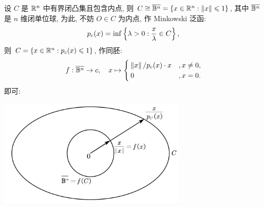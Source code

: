     \begin{Example}
        设 $ C $ 是 $ \mathbb{R}^{n} $ 中有界闭凸集且包含内点, 则 $ C\cong \overline{\mathbb{B}^{n}}=\left\{ x\in\mathbb{R}^{n}:\left\| x \right\|\leqslant 1 \right\} $, 其中 $ \overline{\mathbb{B}^{n}} $ 是 $ n $ 维闭单位球, 为此, 不妨 $ O\in C $ 为内点, 作 Minkowski 泛函:
        \begin{align*}
            p_{c}(x)=\inf\left\{ \lambda>0: \frac{x}{\lambda}\in C \right\},
        \end{align*}
        则 $ C=\left\{ x\in\mathbb{R}^{n}:p_{c}(x)\leqslant1 \right\} $, 作同胚:
        \begin{align*}
            f:\overline{\mathbb{B}^{n}}\to c,\quad x\mapsto\begin{cases}
                \left\| x \right\|/p_{c}(x)\cdot x & , x\neq 0,\\
                0 & , x=0.
            \end{cases}
        \end{align*}
        即可:
        \begin{center}
            \includegraphics[width=9cm]{figures/TopoFig3.png}
        \end{center}
    \end{Example}

